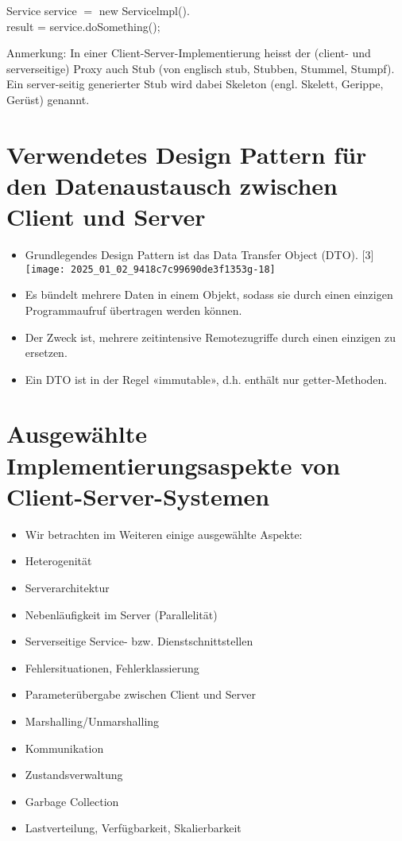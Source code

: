 \documentclass[10pt]{article}
\begin{document}
Service service $=$ new Servicelmpl().\\
result = service.doSomething();

Anmerkung: In einer Client-Server-Implementierung heisst der (client- und serverseitige) Proxy auch Stub (von englisch stub, Stubben, Stummel, Stumpf). Ein server-seitig generierter Stub wird dabei Skeleton (engl. Skelett, Gerippe, Gerüst) genannt.

\section*{Verwendetes Design Pattern für den Datenaustausch zwischen Client und Server}
\begin{itemize}
  \item Grundlegendes Design Pattern ist das Data Transfer Object (DTO). [3]\\
\texttt{[image: 2025\_01\_02\_9418c7c99690de3f1353g-18]}
  \item Es bündelt mehrere Daten in einem Objekt, sodass sie durch einen einzigen Programmaufruf übertragen werden können.
  \item Der Zweck ist, mehrere zeitintensive Remotezugriffe durch einen einzigen zu ersetzen.
  \item Ein DTO ist in der Regel «immutable», d.h. enthält nur getter-Methoden.
\end{itemize}

\section*{Ausgewählte Implementierungsaspekte von Client-Server-Systemen}
\begin{itemize}
  \item Wir betrachten im Weiteren einige ausgewählte Aspekte:
  \item Heterogenität
  \item Serverarchitektur
  \item Nebenläufigkeit im Server (Parallelität)
  \item Serverseitige Service- bzw. Dienstschnittstellen
  \item Fehlersituationen, Fehlerklassierung
  \item Parameterübergabe zwischen Client und Server
  \item Marshalling/Unmarshalling
  \item Kommunikation
  \item Zustandsverwaltung
  \item Garbage Collection
  \item Lastverteilung, Verfügbarkeit, Skalierbarkeit
\end{itemize}
\end{document}
